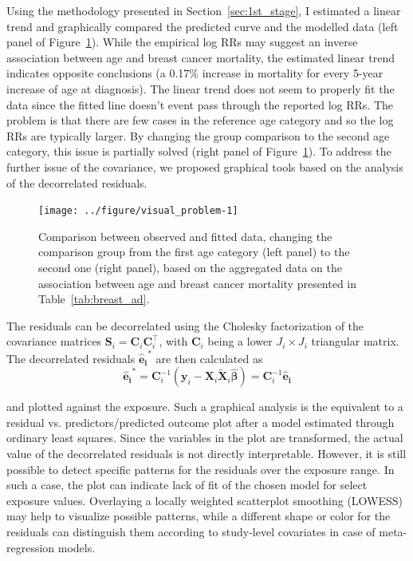 \documentclass[11pt,a4paper,twoside,openany]{book}\usepackage{knitr}
\begin{document}
{{\noindent Using the methodology presented in Section~\ref{sec:1st_stage}, I estimated a linear trend and graphically compared the predicted curve and the modelled data (left panel of Figure~\ref{fig:visual_problem}). While the empirical log RRs may suggest an inverse association between age and breast cancer mortality, the estimated linear trend indicates opposite conclusions (a 0.17\% increase in mortality for every 5-year increase of age at diagnosis). The linear trend does not seem to properly fit the data since the fitted line doesn't event pass through the reported log RRs. The problem is that there are few cases in the reference age category and so the log RRs are typically larger. By changing the group comparison to the second age category, this issue is partially solved (right panel of Figure~\ref{fig:visual_problem}). To address the further issue of the covariance, we proposed graphical tools based on the analysis of the decorrelated residuals.

\begin{knitrout}\footnotesize
{}\color{fgcolor}\begin{figure}[ht!]

{\centering \texttt{[image: ../figure/visual\_problem-1]} 

}

\caption{Comparison between observed and fitted data, changing the comparison group from the first age category (left panel) to the second one (right panel), based on the aggregated data on the association between age and breast cancer mortality presented in Table~\ref{tab:breast_ad}.}\label{fig:visual_problem}
\end{figure}


\end{knitrout}

The residuals can be decorrelated using the Cholesky factorization of the covariance matrices $\mathbf{S}_i = \mathbf{C}_i\mathbf{C}_i^\top$, with $\mathbf{C}_i$ being a lower  $J_i \times J_i$ triangular matrix. The decorrelated residuals $\boldsymbol{\hat e_i}^*$ are then calculated as
\begin{equation}
\boldsymbol{\hat e_i}^* = \mathbf{C}_i^{-1} \left(\mathbf{y}_i - \mathbf{X}_i \widetilde{\mathbf{X}}_i \boldsymbol{\hat \beta} \right) = \mathbf{C}_i^{-1}\boldsymbol{\hat e_i}
\label{eq:decor_res}
\end{equation}

\noindent and plotted against the exposure. Such a graphical analysis is the equivalent to a residual vs. predictors/predicted outcome plot after a model estimated through ordinary least squares. Since the variables in the plot are transformed, the actual value of the decorrelated residuals is not directly interpretable. However, it is still possible to detect specific patterns for the residuals over the exposure range. In such a case, the plot can indicate lack of fit of the chosen model for select exposure values. Overlaying a locally weighted scatterplot smoothing (LOWESS) may help to visualize possible patterns, while a different shape or color for the residuals can distinguish them according to study-level covariates in case of meta-regression models.



}}
\end{document}
